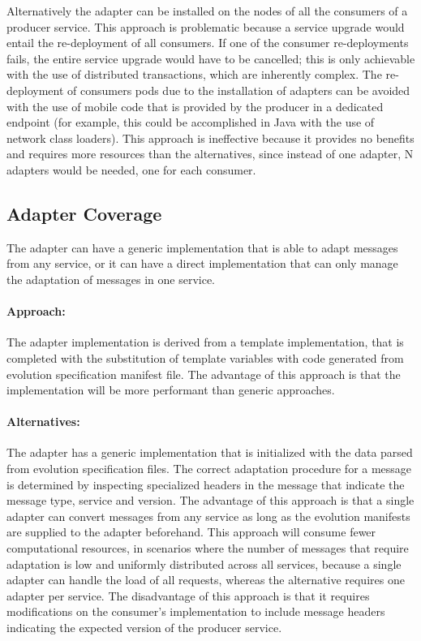 Alternatively the adapter can be installed on the nodes of all the consumers of a producer service.
This approach is problematic because a service upgrade would entail the re-deployment of all consumers.
If one of the consumer re-deployments fails, the entire service upgrade would have to be cancelled;
this is only achievable with the use of distributed transactions, which are inherently complex.
The re-deployment of consumers pods due to the installation of adapters can be avoided with the use of mobile code that is provided by the producer in a dedicated endpoint
(for example, this could be accomplished in Java with the use of network class loaders).
This approach is ineffective because it provides no benefits and requires more resources than the alternatives, since
instead of one adapter, N adapters would be needed, one for each consumer.

\subsection{Adapter Coverage} %
\label{sec:adapter_polymorphism}

The adapter can have a generic implementation that is able to adapt messages from any service, or it can
have a direct implementation that can only manage the adaptation of messages in one service.

\paragraph{Approach:}
The adapter implementation is derived from a template implementation,
that is completed with the substitution of template variables with code generated from evolution specification manifest file.
The advantage of this approach is that the implementation will be more performant than generic approaches.

\paragraph{Alternatives:}
The adapter has a generic implementation that is initialized with the data parsed from evolution specification files.
The correct adaptation procedure for a message is determined by inspecting specialized headers in the
message that indicate the message type, service and version.
The advantage of this approach is that a single adapter can convert messages from any service as long as the evolution manifests are supplied to the adapter beforehand.
This approach will consume fewer computational resources, in scenarios where the number of messages that require adaptation is low and uniformly distributed across all services,
because a single adapter can handle the load of all requests, whereas the alternative requires one adapter per service.
The disadvantage of this approach is that it requires modifications on the consumer's implementation to include message headers indicating the expected version of the producer service.

